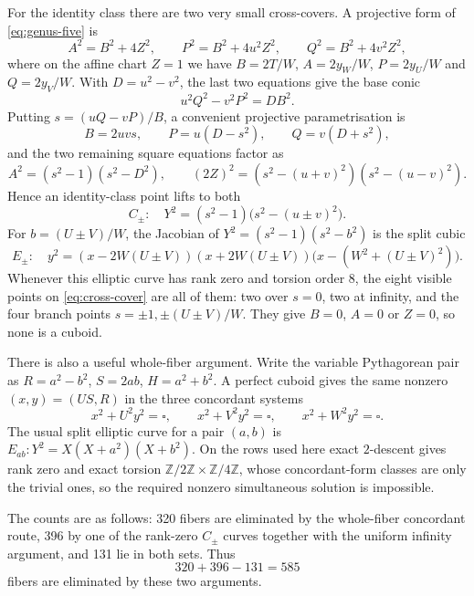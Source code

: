\documentclass[11pt,a4paper]{amsart}
\newcommand{\Z}{\mathbb Z}
\begin{document}
For the identity class there are two very small cross-covers. A projective form of \eqref{eq:genus-five} is
\[
A^2=B^2+4Z^2,\qquad P^2=B^2+4u^2Z^2,\qquad Q^2=B^2+4v^2Z^2,
\]
where on the affine chart $Z=1$ we have $B=2T/W$, $A=2y_W/W$, $P=2y_U/W$ and $Q=2y_V/W$. With $D=u^2-v^2$, the last two equations give the base conic
\[
u^2Q^2-v^2P^2=DB^2.
\]
Putting $s=(uQ-vP)/B$, a convenient projective parametrisation is
\[
B=2uvs,\qquad P=u(D-s^2),\qquad Q=v(D+s^2),
\]
and the two remaining square equations factor as
\[
A^2=(s^2-1)(s^2-D^2),\qquad
(2Z)^2=(s^2-(u+v)^2)(s^2-(u-v)^2).
\]
Hence an identity-class point lifts to both
\begin{equation}\label{eq:cross-cover}
C_\pm:\quad Y^2=(s^2-1)\bigl(s^2-(u\pm v)^2\bigr).
\end{equation}
For $b=(U\pm V)/W$, the Jacobian of $Y^2=(s^2-1)(s^2-b^2)$ is the split cubic
\begin{equation}\label{eq:cross-jacobian}
E_\pm:\quad y^2=(x-2W(U\pm V))(x+2W(U\pm V))
 \bigl(x-(W^2+(U\pm V)^2)\bigr).
\end{equation}
Whenever this elliptic curve has rank zero and torsion order $8$, the eight visible points on \eqref{eq:cross-cover} are all of them: two over $s=0$, two at infinity, and the four branch points $s=\pm1,\pm(U\pm V)/W$. They give $B=0$, $A=0$ or $Z=0$, so none is a cuboid.

There is also a useful whole-fiber argument. Write the variable Pythagorean pair as $R=a^2-b^2$, $S=2ab$, $H=a^2+b^2$. A perfect cuboid gives the same nonzero $(x,y)=(US,R)$ in the three concordant systems
\[
x^2+U^2y^2=\square,\qquad x^2+V^2y^2=\square,\qquad x^2+W^2y^2=\square.
\]
The usual split elliptic curve for a pair $(a,b)$ is $E_{ab}:Y^2=X(X+a^2)(X+b^2)$. On the rows used here exact $2$-descent gives rank zero and exact torsion $\Z/2\Z\times\Z/4\Z$, whose concordant-form classes are only the trivial ones, so the required nonzero simultaneous solution is impossible.

The counts are as follows: 320 fibers are eliminated by the whole-fiber concordant route, 396 by one of the rank-zero $C_\pm$ curves together with the uniform infinity argument, and 131 lie in both sets. Thus
\[
320+396-131=585
\]
fibers are eliminated by these two arguments.
\end{document}
